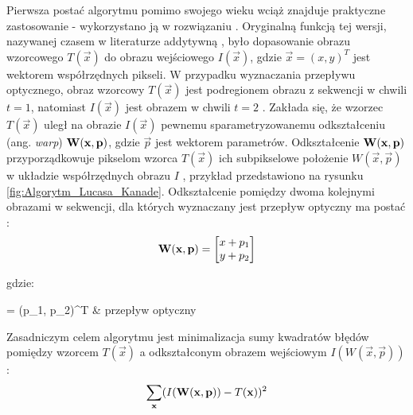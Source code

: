 Pierwsza postać algorytmu pomimo swojego wieku wciąż znajduje praktyczne zastosowanie - wykorzystano ją w rozwiązaniu \cite{Olivares-Mendez2009}. Oryginalną funkcją tej wersji, nazywanej czasem w literaturze addytywną \cite{Baker2004}, było dopasowanie obrazu wzorcowego $T(\vec{x})$ do obrazu wejściowego $I(\vec{x})$, gdzie $\vec{x} = (x, y)^T$ jest wektorem współrzędnych pikseli. W przypadku wyznaczania przepływu optycznego, obraz wzorcowy $T(\vec{x})$ jest podregionem obrazu z sekwencji w chwili $t = 1$, natomiast $I(\vec{x})$ jest obrazem w chwili $t = 2$ \cite{Baker2004}. Zakłada się, że wzorzec $T(\vec{x})$ uległ na obrazie $I(\vec{x})$ pewnemu sparametryzowanemu odkształceniu (ang. \textit{warp}) $\mathbf{W}(\mathbf{x}, \mathbf{p})$, gdzie $\vec{p}$ jest wektorem parametrów. Odkształcenie $\mathbf{W}(\mathbf{x}, \mathbf{p})$ przyporządkowuje pikselom wzorca $T(\vec{x})$ ich subpikselowe położenie $W(\vec{x}, \vec{p})$ w układzie współrzędnych obrazu $I$  \cite{Baker2004}, przykład przedstawiono na rysunku \ref{fig:Algorytm_Lucasa_Kanade}. Odkształcenie pomiędzy dwoma kolejnymi obrazami w sekwencji, dla których wyznaczany jest przepływ optyczny ma postać \cite{Baker2004}:
\begin{equation}
\label{equ:Algorytm_Lucasa_Kanade_odksztalcenie_przeplyw_optyczny}
	\mathbf{W}(\mathbf{x}, \mathbf{p}) = \begin{bmatrix}
		x + p_1 \\
		y + p_2 \\
	\end{bmatrix}
\end{equation}

\noindent
gdzie:

\begin{conditions}
	 = (p_1, p_2)^T & przepływ optyczny \\
\end{conditions}

Zasadniczym celem algorytmu jest minimalizacja sumy kwadratów błędów pomiędzy  wzorcem $T(\vec{x})$ a odkształconym obrazem wejściowym $I(W(\vec{x}, \vec{p}))$ \cite{Baker2004}:
\begin{equation}
\label{equ:Algorytm_Lucasa_Kanade_cel}
	\sum\limits_{\mathbf{x}} (I(\mathbf{W}(\mathbf{x}, \mathbf{p})) - T(\mathbf{x}))^2
\end{equation}

